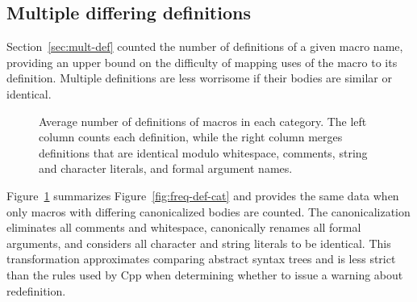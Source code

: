 \documentclass[10pt]{article}
\newcommand{\captionsmall}[1]{\caption[]{\small #1}}
\begin{document}
        
\subsection{Multiple differing definitions}

Section~\ref{sec:mult-def} counted the number of definitions of a given
macro name, providing an upper bound on the difficulty of
mapping uses of the macro to its definition.  Multiple definitions are less worrisome if
their bodies are similar or identical.

        
%   

\begin{figure}
  {\small\centerline{}}
  
  \captionsmall{Average number of definitions of macros in each category.
    The left column counts each definition, while the right column merges
    definitions that are identical modulo whitespace, comments, string and
    character literals, and formal argument names.}
  \label{fig:freq-sum-cat}
\end{figure}


Figure~\ref{fig:freq-sum-cat} summarizes Figure~\ref{fig:freq-def-cat} and
provides the same data when only macros with differing canonicalized bodies
are counted.  The canonicalization eliminates all comments and whitespace,
canonically renames all formal arguments, and considers all character and
string literals to be identical.  This transformation approximates comparing
abstract syntax trees and is less strict than the rules used by Cpp when
determining whether to issue a warning about redefinition.
\end{document}
